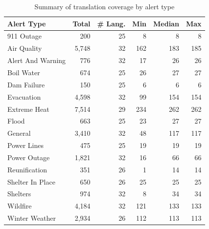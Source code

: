 \begin{table}[t]
\centering
\caption{Summary of translation coverage by alert type}
\label{tab:translations_summary}
\begin{tabular}{lrrrrr}
\hline
\textbf{Alert Type} & \textbf{Total} & \textbf{\# Lang.} & \textbf{Min} & \textbf{Median} & \textbf{Max} \\
\hline
911 Outage & 200 & 25 & 8 & 8 & 8 \\
Air Quality & 5,748 & 32 & 162 & 183 & 185 \\
Alert And Warning & 776 & 32 & 17 & 26 & 26 \\
Boil Water & 674 & 25 & 26 & 27 & 27 \\
Dam Failure & 150 & 25 & 6 & 6 & 6 \\
Evacuation & 4,598 & 32 & 99 & 154 & 154 \\
Extreme Heat & 7,514 & 29 & 234 & 262 & 262 \\
Flood & 663 & 25 & 23 & 27 & 27 \\
General & 3,410 & 32 & 48 & 117 & 117 \\
Power Lines & 475 & 25 & 19 & 19 & 19 \\
Power Outage & 1,821 & 32 & 16 & 66 & 66 \\
Reunification & 351 & 26 & 1 & 14 & 14 \\
Shelter In Place & 650 & 26 & 25 & 25 & 25 \\
Shelters & 974 & 32 & 8 & 34 & 34 \\
Wildfire & 4,184 & 32 & 121 & 133 & 133 \\
Winter Weather & 2,934 & 26 & 112 & 113 & 113 \\
\hline
\end{tabular}
\end{table}